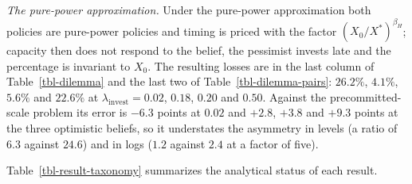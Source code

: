 \documentclass[
  11pt,
  letterpaper,
]{scrartcl}
\begin{document}
\emph{The pure-power approximation.} Under the pure-power approximation
both policies are pure-power policies and timing is priced with the
factor \((X_0/X^*)^{\beta_H}\); capacity then does not respond to the
belief, the pessimist invests late and the percentage is invariant to
\(X_0\). The resulting losses are in the last column of
Table~\ref{tbl-dilemma} and the last two of
Table~\ref{tbl-dilemma-pairs}: \(26.2\%\), \(4.1\%\), \(5.6\%\) and
\(22.6\%\) at \(\lambda_{\text{invest}} = 0.02\), \(0.18\), \(0.20\) and
\(0.50\). Against the precommitted-scale problem its error is \(-6.3\)
points at \(0.02\) and \(+2.8\), \(+3.8\) and \(+9.3\) points at the
three optimistic beliefs, so it understates the asymmetry in levels (a
ratio of \(6.3\) against \(24.6\)) and in logs (\(1.2\) against \(2.4\)
at a factor of five).

\newpage

Table~\ref{tbl-result-taxonomy} summarizes the analytical status of each
result.
\end{document}
